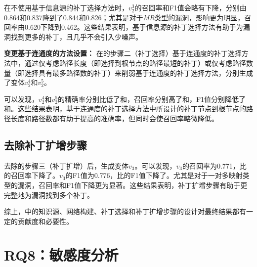 在不使用基于信息源的补丁选择方法时，$v_2^3$的召回率和F1值会略有下降，分别由0.864和0.837降到了0.844和0.826；尤其是对于\textit{MR}类型的漏洞，影响更为明显，召回率由0.620下降到0.462。这些结果表明，基于信息源的补丁选择方法有助于为漏洞找到更多的补丁，且几乎不会引入少噪声。


\textbf{变更基于连通度的方法设置：}
在\tool 的步骤二（补丁选择）基于连通度的补丁选择方法中，通过仅考虑路径长度（即选择到根节点的路径最短的补丁）或仅考虑路径数量（即选择具有最多路径数的补丁）来削弱基于连通度的补丁选择方法，分别生成了变体$v_2^4$和$v_2^5$。

可以发现，$v_2^4$和$v_2^5$的精确率分别比\tool 低了和，召回率分别高了和，F1值分别降低了和。这些结果表明，基于连通度的补丁选择方法中所设计的补丁节点到根节点的路径长度和路径数都有助于提高\tool 的准确率，但同时会使召回率略微降低。

\subsection{去除补丁扩增步骤}
去除\tool 的步骤三（补丁扩增）后，生成变体$v_3$。可以发现，$v_3$的召回率为0.771，比\tool 的召回率下降了。$v_3$的F1值为0.776，比\tool 的F1值下降了。尤其是对于一对多映射类型的漏洞，召回率和F1值下降更为显著。这些结果表明，补丁扩增步骤有助于\tool 更完整地为漏洞找到多个补丁。

综上，\tool 中的知识源、网络构建、补丁选择和补丁扩增步骤的设计对最终结果都有一定的贡献度和必要性。


\section{RQ8：敏感度分析}\label{sec:sensitivity}

